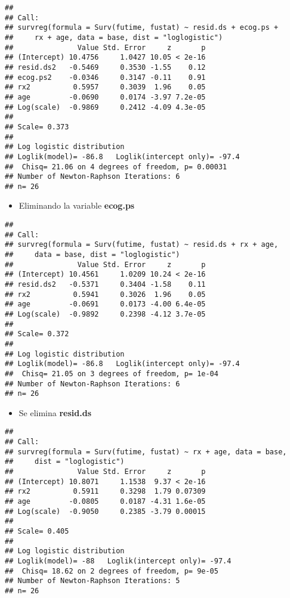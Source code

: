 \documentclass[
]{article}
\providecommand{\tightlist}{%
  \setlength{\itemsep}{0pt}\setlength{\parskip}{0pt}}
\begin{document}
\begin{verbatim}
## 
## Call:
## survreg(formula = Surv(futime, fustat) ~ resid.ds + ecog.ps + 
##     rx + age, data = base, dist = "loglogistic")
##               Value Std. Error     z       p
## (Intercept) 10.4756     1.0427 10.05 < 2e-16
## resid.ds2   -0.5469     0.3530 -1.55    0.12
## ecog.ps2    -0.0346     0.3147 -0.11    0.91
## rx2          0.5957     0.3039  1.96    0.05
## age         -0.0690     0.0174 -3.97 7.2e-05
## Log(scale)  -0.9869     0.2412 -4.09 4.3e-05
## 
## Scale= 0.373 
## 
## Log logistic distribution
## Loglik(model)= -86.8   Loglik(intercept only)= -97.4
##  Chisq= 21.06 on 4 degrees of freedom, p= 0.00031 
## Number of Newton-Raphson Iterations: 6 
## n= 26
\end{verbatim}

\begin{itemize}
\tightlist
\item
  Eliminando la variable \textbf{ecog.ps}
\end{itemize}

\begin{verbatim}
## 
## Call:
## survreg(formula = Surv(futime, fustat) ~ resid.ds + rx + age, 
##     data = base, dist = "loglogistic")
##               Value Std. Error     z       p
## (Intercept) 10.4561     1.0209 10.24 < 2e-16
## resid.ds2   -0.5371     0.3404 -1.58    0.11
## rx2          0.5941     0.3026  1.96    0.05
## age         -0.0691     0.0173 -4.00 6.4e-05
## Log(scale)  -0.9892     0.2398 -4.12 3.7e-05
## 
## Scale= 0.372 
## 
## Log logistic distribution
## Loglik(model)= -86.8   Loglik(intercept only)= -97.4
##  Chisq= 21.05 on 3 degrees of freedom, p= 1e-04 
## Number of Newton-Raphson Iterations: 6 
## n= 26
\end{verbatim}

\begin{itemize}
\tightlist
\item
  Se elimina \textbf{resid.ds}
\end{itemize}

\begin{verbatim}
## 
## Call:
## survreg(formula = Surv(futime, fustat) ~ rx + age, data = base, 
##     dist = "loglogistic")
##               Value Std. Error     z       p
## (Intercept) 10.8071     1.1538  9.37 < 2e-16
## rx2          0.5911     0.3298  1.79 0.07309
## age         -0.0805     0.0187 -4.31 1.6e-05
## Log(scale)  -0.9050     0.2385 -3.79 0.00015
## 
## Scale= 0.405 
## 
## Log logistic distribution
## Loglik(model)= -88   Loglik(intercept only)= -97.4
##  Chisq= 18.62 on 2 degrees of freedom, p= 9e-05 
## Number of Newton-Raphson Iterations: 5 
## n= 26
\end{verbatim}
\end{document}
